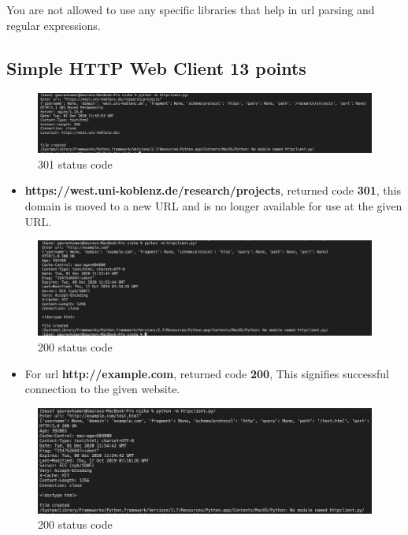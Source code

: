 \documentclass{resources/WeSTassignment}
\begin{document}
\begin{enumerate}
\begin{enumerate}
\end{enumerate}

You are not allowed to use any specific libraries that help in url parsing and regular expressions. 

\subsection{Simple HTTP Web Client \hfill{13 points}}
\begin{figure}[h!]
  \includegraphics[width=\linewidth]{resources/301_new.png}
  \caption{301 status code}
  \label{301 status code}
\end{figure}
\begin{itemize}

\item \textbf{https://west.uni-koblenz.de/research/projects}, returned code \textbf{301}, this domain is moved to a new URL and is no longer available for use at the given URL.

\end{itemize}
\begin{figure}[h!]
  \includegraphics[width=\linewidth]{resources/200_new.png}
  \caption{200 status code}
  \label{200 status code}
\end{figure}
\begin{itemize}

\item For url \textbf{http://example.com}, returned code \textbf{200}, This signifies successful connection to the given website.

\end{itemize}
\begin{figure}[h!]
  \includegraphics[width=\linewidth]{resources/200_new_2.png}
  \caption{200 status code}
  \label{200 status code}
\end{figure}
\begin{itemize}


\end{itemize}
\end{enumerate}
\end{document}
